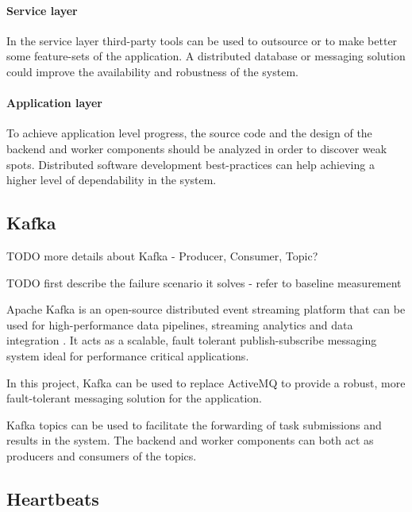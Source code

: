 \paragraph{Service layer} In the service layer third-party tools can be used to outsource or to make better some feature-sets of the application. A distributed database or messaging solution could improve the availability and robustness of the system.

\paragraph{Application layer} To achieve application level progress, the source code and the design of the backend and worker components should be analyzed in order to discover weak spots. Distributed software development best-practices can help achieving a higher level of dependability in the system.

\subsection{Kafka}

TODO more details about Kafka - Producer, Consumer, Topic?

TODO first describe the failure scenario it solves -  refer to baseline measurement

Apache Kafka is an open-source distributed event streaming platform that can be used for high-performance data pipelines, streaming analytics and data integration \cite{Kafka}. It acts as a scalable, fault tolerant publish-subscribe messaging system ideal for performance critical applications.

In this project, Kafka can be used to replace ActiveMQ to provide a robust, more fault-tolerant messaging solution for the application.

Kafka topics can be used to facilitate the forwarding of task submissions and results in the system. The backend and worker components can both act as producers and consumers of the topics.

\subsection{Heartbeats}

